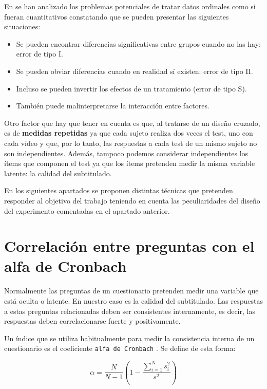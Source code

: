 \documentclass[
  12pt,
  a4paper,
  extrafontsizes,
  onecolumn,
  openright,
  table]{memoir}
\providecommand{\tightlist}{%
  \setlength{\itemsep}{0pt}\setlength{\parskip}{0pt}}\usepackage{longtable,booktabs,array}
\begin{document}
En \textcite{kruschke2018} se han analizado los problemas potenciales de
tratar datos ordinales como si fueran cuantitativos constatando que se
pueden presentar las siguientes situaciones:

\begin{itemize}
\tightlist
\item
  Se pueden encontrar diferencias significativas entre grupos cuando no
  las hay: error de tipo I.
\item
  Se pueden obviar diferencias cuando en realidad sí existen: error de
  tipo II.
\item
  Incluso se pueden invertir los efectos de un tratamiento (error de
  tipo S).
\item
  También puede malinterpretarse la interacción entre factores.
\end{itemize}

Otro factor que hay que tener en cuenta es que, al tratarse de un diseño
cruzado, es de \textbf{medidas repetidas} ya que cada sujeto realiza dos
veces el test, uno con cada vídeo y que, por lo tanto, las respuestas a
cada test de un mismo sujeto no son independientes. Además, tampoco
podemos considerar independientes los ítems que componen el test ya que
los ítems pretenden medir la misma variable latente: la calidad del
subtitulado.

En los siguientes apartados se proponen distintas técnicas que pretenden
responder al objetivo del trabajo teniendo en cuenta las peculiaridades
del diseño del experimento comentadas en el apartado anterior.

\hypertarget{sec-cronbach}{%
\section{Correlación entre preguntas con el alfa de
Cronbach}\label{sec-cronbach}}

Normalmente las preguntas de un cuestionario pretenden medir una
variable que está oculta o latente. En nuestro caso es la calidad del
subtitulado. Las respuestas a estas preguntas relacionadas deben ser
consistentes internamente, es decir, las respuestas deben
correlacionarse fuerte y positivamente.

Un índice que se utiliza habitualmente para medir la consistencia
interna de un cuestionario es el coeficiente \texttt{alfa\ de\ Cronbach}
\autocite[ver][]{schweinberger2020survey}. Se define de esta forma:

\begin{equation}
\alpha = \frac{N}{N-1} \left(1 - \frac{\sum_{i=1}^{N} s_{i}^{2}}{s^{2}} \right)
\end{equation}
\end{document}
